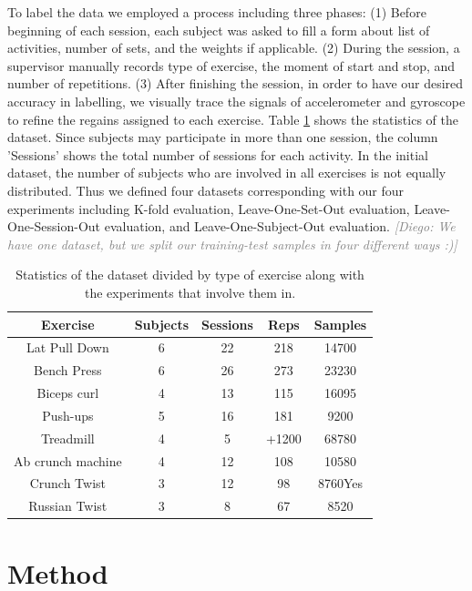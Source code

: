 \documentclass[journal,article,submit,moreauthors,pdftex]{Definitions/mdpi}
\newcommand{\diego}[1]{\textcolor{gray}{{\it [Diego: #1]}}}
\begin{document}
To label the data we employed a process including three phases: (1) Before beginning of each session, each subject was asked to fill a form about list of activities, number of sets, and the weights if applicable. (2) During the session, a supervisor manually records type of exercise, the moment of start and stop, and number of repetitions. (3) After finishing the session, in order to have our desired accuracy in labelling, we visually trace the signals of accelerometer and gyroscope to refine the regains assigned to each exercise.
Table \ref{dataset_statistics} shows the statistics of the dataset. Since subjects may participate in more than one session, the column 'Sessions' shows the total number of sessions for each activity. In the initial dataset, the number of subjects who are involved in all exercises is not equally distributed. Thus we defined four datasets corresponding with our four experiments including K-fold evaluation, Leave-One-Set-Out evaluation, Leave-One-Session-Out evaluation, and Leave-One-Subject-Out evaluation.
\diego{We have one dataset, but we split our training-test samples in four different ways :)}
\begin{table}[H]
	\caption{Statistics of the dataset divided by type of exercise along with the experiments that involve them in.}
	\centering
	\begin{tabular}{ccccc}
		\toprule
		\textbf{Exercise} & \textbf{Subjects} & \textbf{Sessions}	 & \textbf{Reps} & \textbf{Samples}  \\
		\midrule		
		Lat Pull Down& 6& 22& 218& 14700\\
		Bench Press	& 6& 26& 273& 23230\\
		Biceps curl	& 4& 13& 115& 16095\\
		Push-ups & 5& 16& 181& 9200\\
		Treadmill& 4& 5& +1200 & 68780\\
		Ab crunch machine& 4& 12& 108 & 10580\\
		Crunch Twist &  3& 12& 98& 8760Yes\\
		Russian Twist & 3& 8& 67& 8520\\
		\bottomrule
	\end{tabular}
	\label{dataset_statistics}
\end{table}


\section{Method}
\end{document}
